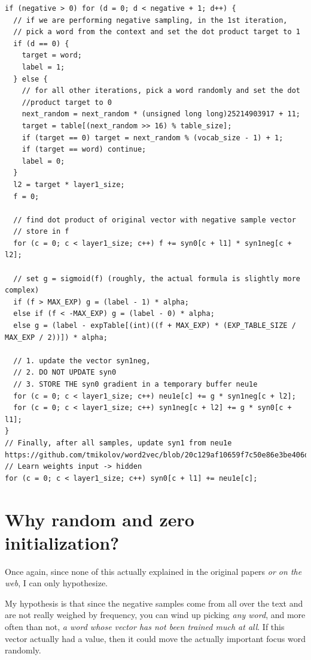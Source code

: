 \documentclass[11pt]{book}
\begin{document}
\begin{verbatim}
if (negative > 0) for (d = 0; d < negative + 1; d++) {
  // if we are performing negative sampling, in the 1st iteration,
  // pick a word from the context and set the dot product target to 1
  if (d == 0) {
    target = word;
    label = 1;
  } else {
    // for all other iterations, pick a word randomly and set the dot
    //product target to 0
    next_random = next_random * (unsigned long long)25214903917 + 11;
    target = table[(next_random >> 16) % table_size];
    if (target == 0) target = next_random % (vocab_size - 1) + 1;
    if (target == word) continue;
    label = 0;
  }
  l2 = target * layer1_size;
  f = 0;

  // find dot product of original vector with negative sample vector
  // store in f
  for (c = 0; c < layer1_size; c++) f += syn0[c + l1] * syn1neg[c + l2];

  // set g = sigmoid(f) (roughly, the actual formula is slightly more complex)
  if (f > MAX_EXP) g = (label - 1) * alpha;
  else if (f < -MAX_EXP) g = (label - 0) * alpha;
  else g = (label - expTable[(int)((f + MAX_EXP) * (EXP_TABLE_SIZE / MAX_EXP / 2))]) * alpha;

  // 1. update the vector syn1neg,
  // 2. DO NOT UPDATE syn0
  // 3. STORE THE syn0 gradient in a temporary buffer neu1e
  for (c = 0; c < layer1_size; c++) neu1e[c] += g * syn1neg[c + l2];
  for (c = 0; c < layer1_size; c++) syn1neg[c + l2] += g * syn0[c + l1];
}
// Finally, after all samples, update syn1 from neu1e
https://github.com/tmikolov/word2vec/blob/20c129af10659f7c50e86e3be406df663beff438/word2vec.c#L541
// Learn weights input -> hidden
for (c = 0; c < layer1_size; c++) syn0[c + l1] += neu1e[c];
\end{verbatim}

\section{Why random and zero initialization?}

Once again, since none of this actually explained in the original papers
\emph{or on the web}, I can only hypothesize.

My hypothesis is that since the negative samples come from all over the text
and are not really weighed by frequency, you can wind up picking \emph{any word},
and more often than not, \emph{a word whose vector has not been trained much at all}.
If this vector actually had a value, then it could move the actually important
focus word randomly.
\end{document}
